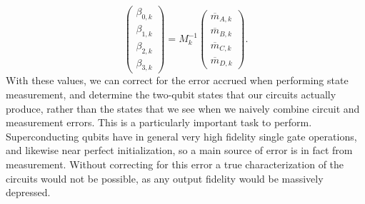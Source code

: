 \begin{equation}
  \begin{pmatrix}
    \beta_{0,k} \\ \beta_{1,k} \\ \beta_{2,k} \\ \beta_{3,k}
  \end{pmatrix} = M_k^{-1}
  \begin{pmatrix}
    \overline{m}_{A,k} \\ \overline{m}_{B,k} \\ \overline{m}_{C,k}
    \\ \overline{m}_{D,k}
  \end{pmatrix}.
\end{equation}
With these values, we can correct for the error accrued when performing state
measurement, and determine the two-qubit states that our circuits actually
produce, rather than the states that we see when we naively combine circuit and
measurement errors. This is a particularly important task to perform.
Superconducting qubits have in general very high fidelity single gate
operations, and likewise near perfect initialization, so a main source of error
is in fact from measurement. Without correcting for this error a true
characterization of the circuits would not be possible, as any output fidelity
would be massively depressed.

